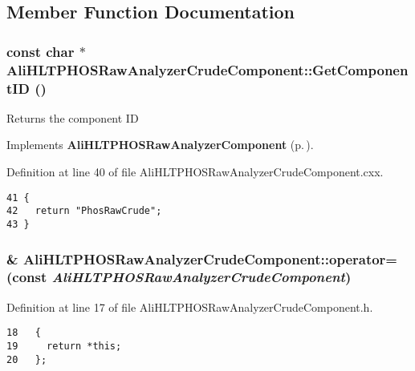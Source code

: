 \subsection{Member Function Documentation}
\subsubsection{\setlength{\rightskip}{0pt plus 5cm}const char $\ast$ Ali\-HLTPHOSRaw\-Analyzer\-Crude\-Component::Get\-Component\-ID ()\hspace{0.3cm}{\tt  [virtual]}}\label{classAliHLTPHOSRawAnalyzerCrudeComponent_a4}


Returns the component ID 

Implements {\bf Ali\-HLTPHOSRaw\-Analyzer\-Component} {\rm (p.\,\pageref{classAliHLTPHOSRawAnalyzerComponent_a12})}.

Definition at line 40 of file Ali\-HLTPHOSRaw\-Analyzer\-Crude\-Component.cxx.

\footnotesize\begin{verbatim}41 {
42   return "PhosRawCrude";
43 }
\end{verbatim}\normalsize 


\subsubsection{\& Ali\-HLTPHOSRaw\-Analyzer\-Crude\-Component::operator= (const  {\em Ali\-HLTPHOSRaw\-Analyzer\-Crude\-Component})\hspace{0.3cm}{\tt  [inline]}}\label{classAliHLTPHOSRawAnalyzerCrudeComponent_a3}




Definition at line 17 of file Ali\-HLTPHOSRaw\-Analyzer\-Crude\-Component.h.

\footnotesize\begin{verbatim}18   {
19     return *this;
20   };
\end{verbatim}\normalsize 


